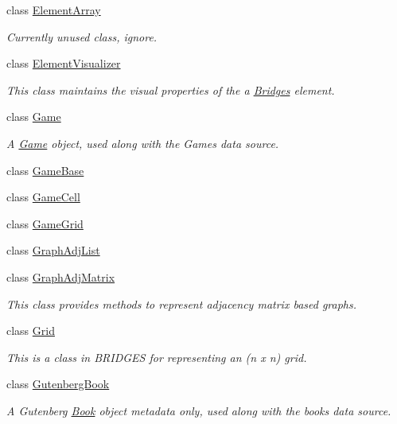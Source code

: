\begin{DoxyCompactItemize}
class \mbox{\hyperlink{classbridges_1_1_element_array}{Element\+Array}}
\begin{DoxyCompactList}\small\item\em Currently unused class, ignore. \end{DoxyCompactList}\item 
class \mbox{\hyperlink{classbridges_1_1_element_visualizer}{Element\+Visualizer}}
\begin{DoxyCompactList}\small\item\em This class maintains the visual properties of the a \mbox{\hyperlink{classbridges_1_1_bridges}{Bridges}} element. \end{DoxyCompactList}\item 
class \mbox{\hyperlink{classbridges_1_1_game}{Game}}
\begin{DoxyCompactList}\small\item\em A \mbox{\hyperlink{classbridges_1_1_game}{Game}} object, used along with the Games data source. \end{DoxyCompactList}\item 
class \mbox{\hyperlink{classbridges_1_1_game_base}{Game\+Base}}
\item 
class \mbox{\hyperlink{classbridges_1_1_game_cell}{Game\+Cell}}
\item 
class \mbox{\hyperlink{classbridges_1_1_game_grid}{Game\+Grid}}
\item 
class \mbox{\hyperlink{classbridges_1_1_graph_adj_list}{Graph\+Adj\+List}}
\item 
class \mbox{\hyperlink{classbridges_1_1_graph_adj_matrix}{Graph\+Adj\+Matrix}}
\begin{DoxyCompactList}\small\item\em This class provides methods to represent adjacency matrix based graphs. \end{DoxyCompactList}\item 
class \mbox{\hyperlink{classbridges_1_1_grid}{Grid}}
\begin{DoxyCompactList}\small\item\em This is a class in B\+R\+I\+D\+G\+ES for representing an (n x n) grid. \end{DoxyCompactList}\item 
class \mbox{\hyperlink{classbridges_1_1_gutenberg_book}{Gutenberg\+Book}}
\begin{DoxyCompactList}\small\item\em A Gutenberg \mbox{\hyperlink{classbridges_1_1_book}{Book}} object metadata only, used along with the books data source. \end{DoxyCompactList}\item 

\end{DoxyCompactItemize}
